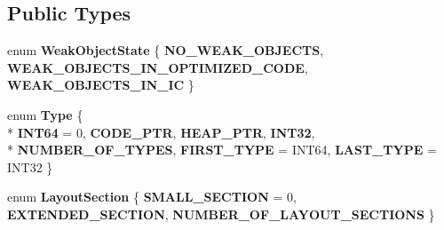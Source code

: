 \subsection*{Public Types}
\begin{DoxyCompactItemize}
\item 
\hypertarget{classv8_1_1internal_1_1_constant_pool_array_a49ff6e581179686154b4232a7b2741e1}{}enum {\bfseries Weak\+Object\+State} \{ {\bfseries N\+O\+\_\+\+W\+E\+A\+K\+\_\+\+O\+B\+J\+E\+C\+T\+S}, 
{\bfseries W\+E\+A\+K\+\_\+\+O\+B\+J\+E\+C\+T\+S\+\_\+\+I\+N\+\_\+\+O\+P\+T\+I\+M\+I\+Z\+E\+D\+\_\+\+C\+O\+D\+E}, 
{\bfseries W\+E\+A\+K\+\_\+\+O\+B\+J\+E\+C\+T\+S\+\_\+\+I\+N\+\_\+\+I\+C}
 \}\label{classv8_1_1internal_1_1_constant_pool_array_a49ff6e581179686154b4232a7b2741e1}

\item 
\hypertarget{classv8_1_1internal_1_1_constant_pool_array_a088dcb20bcc02c24e76b651d0b01ec81}{}enum {\bfseries Type} \{ \\*
{\bfseries I\+N\+T64} = 0, 
{\bfseries C\+O\+D\+E\+\_\+\+P\+T\+R}, 
{\bfseries H\+E\+A\+P\+\_\+\+P\+T\+R}, 
{\bfseries I\+N\+T32}, 
\\*
{\bfseries N\+U\+M\+B\+E\+R\+\_\+\+O\+F\+\_\+\+T\+Y\+P\+E\+S}, 
{\bfseries F\+I\+R\+S\+T\+\_\+\+T\+Y\+P\+E} = I\+N\+T64, 
{\bfseries L\+A\+S\+T\+\_\+\+T\+Y\+P\+E} = I\+N\+T32
 \}\label{classv8_1_1internal_1_1_constant_pool_array_a088dcb20bcc02c24e76b651d0b01ec81}

\item 
\hypertarget{classv8_1_1internal_1_1_constant_pool_array_abb4d5d4476b1c5f85110f660338e9172}{}enum {\bfseries Layout\+Section} \{ {\bfseries S\+M\+A\+L\+L\+\_\+\+S\+E\+C\+T\+I\+O\+N} = 0, 
{\bfseries E\+X\+T\+E\+N\+D\+E\+D\+\_\+\+S\+E\+C\+T\+I\+O\+N}, 
{\bfseries N\+U\+M\+B\+E\+R\+\_\+\+O\+F\+\_\+\+L\+A\+Y\+O\+U\+T\+\_\+\+S\+E\+C\+T\+I\+O\+N\+S}
 \}\label{classv8_1_1internal_1_1_constant_pool_array_abb4d5d4476b1c5f85110f660338e9172}

\end{DoxyCompactItemize}
